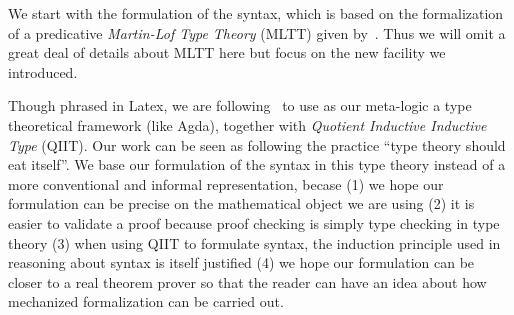 We start with the formulation of the syntax, which is based on the
formalization of a predicative \textit{Martin-Lof Type Theory} (MLTT)
given by~\citet{coquand2018canonicity}. Thus we will omit a great deal
of details about MLTT here but focus on the new facility we introduced. 

Though phrased in Latex, we are following~\citet{altkap2016} to use as
our meta-logic a type theoretical framework (like Agda), 
together with \textit{Quotient Inductive Inductive Type} (QIIT). Our work can be seen as following the practice ``type theory should eat itself''\cite{dybjer1995internal, chapman2009type}. We base our formulation of the syntax in this type theory instead of a more conventional and informal representation, becase (1) we hope our formulation can be precise on the mathematical object we are using (2) it is easier to validate a proof because proof checking is simply type checking in type theory (3) when using QIIT to formulate syntax, the induction principle used in reasoning about syntax is itself justified (4) we hope our formulation can be closer to a real theorem prover so that the reader can have an idea about how mechanized formalization can be carried out.









